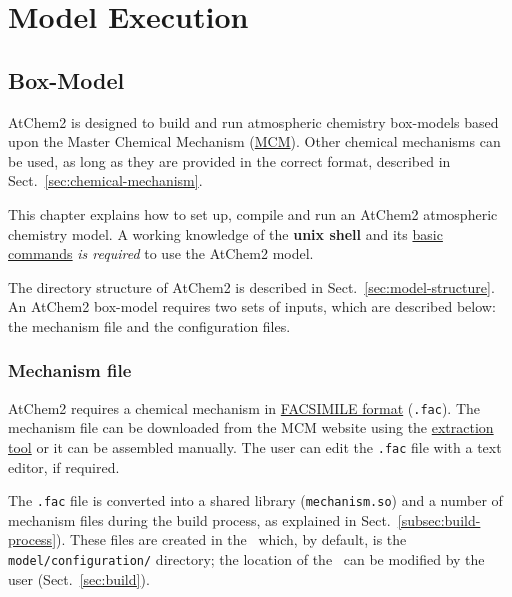 %
%
%
%

\chapter{Model Execution} \label{ch:execution}

\section{Box-Model} \label{sec:box-model}

AtChem2 is designed to build and run atmospheric chemistry box-models
based upon the Master Chemical Mechanism (\href{http://mcm.leeds.ac.uk/MCM/}{MCM}).
Other chemical mechanisms can be used, as long as they are provided in
the correct format, described in Sect.~\ref{sec:chemical-mechanism}.

This chapter explains how to set up, compile and run an AtChem2
atmospheric chemistry model. A working knowledge of the \textbf{unix shell} and its
\href{https://swcarpentry.github.io/shell-novice/reference/}{basic commands}
\emph{is required} to use the AtChem2 model.

The directory structure of AtChem2 is described in
Sect.~\ref{sec:model-structure}. An AtChem2 box-model requires two
sets of inputs, which are described below: the mechanism
file and the configuration files.

\subsection{Mechanism file} \label{subsec:mechanism-file}

AtChem2 requires a chemical mechanism in
\hyperref[subsec:facsimile-format]{FACSIMILE format} (\texttt{.fac}).
The mechanism file can be downloaded from the MCM website using the
\hyperref[subsec:mcm-extraction]{extraction tool} or it can be
assembled manually. The user can edit the \texttt{.fac} file with a
text editor, if required.

The \texttt{.fac} file is converted into a shared library
(\texttt{mechanism.so}) and a number of mechanism files during the
build process, as explained in Sect.~\ref{subsec:build-process}).
These files are created in the \sharedir\ which, by default, is the
\texttt{model/configuration/} directory; the location of the
\sharedir\ can be modified by the user (Sect.~\ref{sec:build}).

